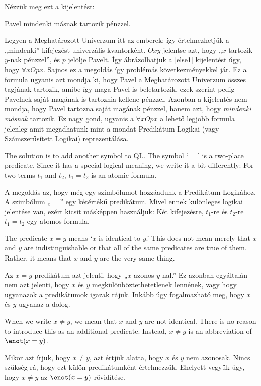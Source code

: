 Nézzük meg ezt a kijelentést:
\begin{earg}
\item[\ex{else1}] Pavel mindenki másnak tartozik pénzzel.
\end{earg}
Legyen a Meghatározott Univerzum itt az emberek; így értelmezhetjük a „mindenki” kifejezést univerzális kvantorként. $Oxy$ jelentse azt, hogy „$x$ tartozik $y$-nak pénzzel”, és $p$ jelölje Pavelt. Így ábrázolhatjuk a \ref{else1} kijelentést úgy, hogy $\forall x Opx$. Sajnos ez a megoldás így problémás következményekkel jár. Ez a formula ugyanis azt mondja ki, hogy Pavel a Meghatározott Univerzum összes tagjának tartozik, amibe így maga Pavel is beletartozik, ezek szerint pedig Pavelnek saját magának is tartoznia kellene pénzzel. Azonban a kijelentés nem mondja, hogy Pavel tartozna saját magának pénzzel, hanem azt, hogy \emph{mindenki másnak} tartozik. Ez nagy gond, ugyanis a $\forall x Opx$ a lehető legjobb formula jelenleg amit megadhatunk mint a mondat Predikátum Logikai (vagy Számszerűsített Logikai) reprezentálása.

The solution is to add another symbol to QL. The symbol `$=$' is a two-place predicate. Since it has a special logical meaning, we write it a bit differently: For two terms $t_1$ and $t_2$, $t_1=t_2$ is an atomic formula.

A megoldás az, hogy még egy szimbólumot hozzáadunk a Predikátum Logikához. A szimbólum „$=$” egy kétértékű predikátum. Mivel ennek különleges logikai jelentése van, ezért kicsit másképpen használjuk: Két kifejezésre, $t_1$-re és $t_2$-re $t_1=t_2$ egy atomos formula.

The predicate $x=y$ means `$x$ is identical to $y$.' This does not mean merely that $x$ and $y$ are indistinguishable or that all of the same predicates are true of them. Rather, it means that $x$ and $y$ are the very same thing.

Az $x=y$ predikátum azt jelenti, hogy „$x$ azonos $y$-nal.” Ez azonban egyáltalán nem azt jelenti, hogy $x$ és $y$ megkülönböztethetetlenek lennének, vagy hogy ugyanazok a predikátumok igazak rájuk. Inkább úgy fogalmazható meg, hogy $x$ és $y$ ugyanaz a dolog.

When we write $x \neq y$, we mean that $x$ and $y$ are not identical. There is no reason to introduce this as an additional predicate. Instead, $x \neq y$ is an abbreviation of $\enot(x = y)$.

Mikor azt írjuk, hogy $x \neq y$, azt értjük alatta, hogy $x$ és $y$ nem azonosak. Nincs szükség rá, hogy ezt külön predikátumként értelmezzük. Ehelyett vegyük úgy, hogy $x \neq y$ az $\enot(x = y)$ rövidítése.

